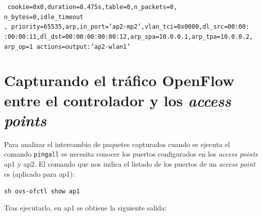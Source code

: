 \documentclass[a4paper,12pt,twoside,spanish]{book}
\begin{document}
\noindent\texttt{
	cookie=0x0,duration=8.475s,table=0,n\_packets=0, n\_bytes=0,idle\_timeout\\
	, priority=65535,arp,in\_port='ap2-mp2',vlan\_tci=0x0000,dl\_src=00:00:\\
	:00:00:11,dl\_dst=00:00:00:00:00:12,arp\_spa=10.0.0.1,arp\_tpa=10.0.0.2,\\
	\indent arp\_op=1 actions=output:'ap2-wlan1'
}








\section{Capturando el tráfico OpenFlow entre el controlador y los \textit{access points}}\label{sect:capt_of}

Para analizar el intercambio de paquetes capturados cuando se ejecuta el comando \texttt{pingall} se necesita conocer los puertos configurados en los \textit{access points} ap1 y ap2. El comando que nos indica el listado de los puertos de un \textit{access point} es (aplicado para ap1):\par 

\begin{center}
	\texttt{sh ovs-ofctl show ap1}
\end{center}

Tras ejecutarlo, en ap1 se obtiene la siguiente salida:
\end{document}
